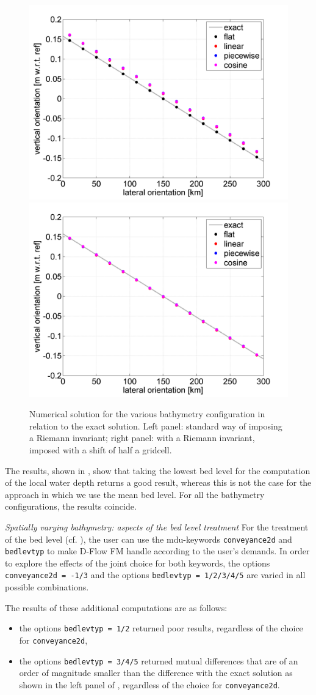 \begin{figure}[h!]
\begin{center}
\includegraphics[width=0.48\columnwidth]{figures/resultsbathymetry.png}
\includegraphics[width=0.48\columnwidth]{figures/resultsbathymetryshift.png}
\end{center}\caption{Numerical solution for the various bathymetry configuration in relation to the exact solution. Left panel: standard way of imposing a Riemann invariant; right panel: with a Riemann invariant, imposed with a shift of half a gridcell. \label{fig:resultscoriolisbathymetry}}
\end{figure}

The results, shown in , show that taking the lowest bed level for the computation of the local water depth returns a good result, whereas this is not the case for the approach in which we use the mean bed level. For all the bathymetry configurations, the results coincide.


\emph{Spatially varying bathymetry: aspects of the bed level treatment}\newline
For the treatment of the bed level (cf. ), the user can use the mdu-keywords \texttt{conveyance2d} and \texttt{bedlevtyp} to make D-Flow FM handle according to the user's demands. In order to explore the effects of the joint choice for both keywords, the options \texttt{conveyance2d = -1/3} and the options \texttt{bedlevtyp = 1/2/3/4/5} are varied in all possible combinations.

The results of these additional computations are as follows:
\begin{itemize}
\item the options \texttt{bedlevtyp = 1/2} returned poor results, regardless of the choice for \texttt{conveyance2d},
\item the options \texttt{bedlevtyp = 3/4/5} returned mutual differences that are of an order of magnitude smaller than the difference with the exact solution as shown in the left panel of , regardless of the choice for \texttt{conveyance2d}.
\end{itemize}






